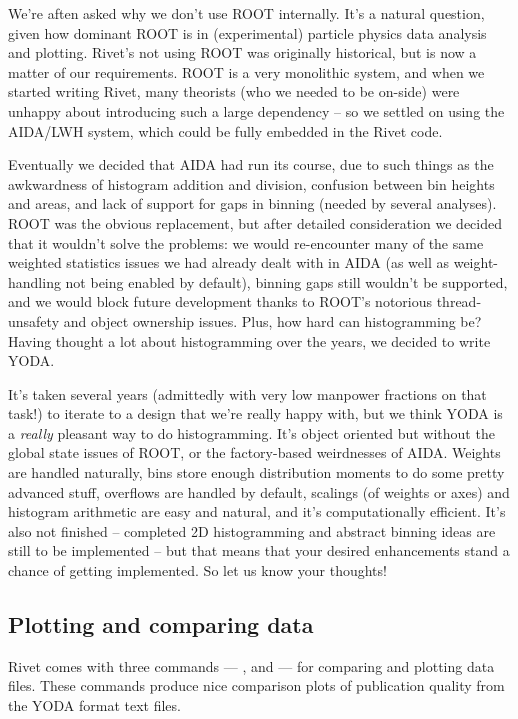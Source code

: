 \begin{detail}
  We're aften asked why we don't use ROOT internally. It's a natural question,
  given how dominant ROOT is in (experimental) particle physics data analysis
  and plotting. Rivet's not using ROOT was originally historical, but is now a
  matter of our requirements. ROOT is a very monolithic system, and when we
  started writing Rivet, many theorists (who we needed to be on-side) were
  unhappy about introducing such a large dependency -- so we settled on using
  the AIDA/LWH system, which could be fully embedded in the Rivet code.

  Eventually we decided that AIDA had run its course, due to such things as the
  awkwardness of histogram addition and division, confusion between bin heights
  and areas, and lack of support for gaps in binning (needed by several
  analyses). ROOT was the obvious replacement, but after detailed consideration
  we decided that it wouldn't solve the problems: we would re-encounter many of
  the same weighted statistics issues we had already dealt with in AIDA (as well
  as weight-handling not being enabled by default), binning gaps still wouldn't
  be supported, and we would block future development thanks to ROOT's notorious
  thread-unsafety and object ownership issues. Plus, how hard can histogramming
  be? Having thought a lot about histogramming over the years, we decided to
  write YODA.

  It's taken several years (admittedly with very low manpower fractions on that
  task!) to iterate to a design that we're really happy with, but we think YODA
  is a \emph{really} pleasant way to do histogramming. It's object oriented but
  without the global state issues of ROOT, or the factory-based weirdnesses of
  AIDA. Weights are handled naturally, bins store enough distribution moments to
  do some pretty advanced stuff, overflows are handled by default, scalings (of
  weights or axes) and histogram arithmetic are easy and natural, and it's
  computationally efficient. It's also not finished -- completed 2D
  histogramming and abstract binning ideas are still to be implemented -- but
  that means that your desired enhancements stand a chance of getting
  implemented. So let us know your thoughts!
\end{detail}


\subsection{Plotting and comparing data}
\label{sec:plotting}
Rivet comes with three commands --- ,  and
 --- for comparing and plotting data files. These commands
produce nice comparison plots of publication quality from the YODA format text
files.

